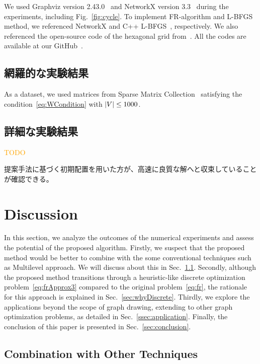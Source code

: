 \documentclass[dvipdfmx,lettersize,journal]{IEEEtran}
\newcommand{\orange}[1]{\textcolor{orange}{#1}}
\begin{document}
We used Graphviz version 2.43.0~\cite{ellsonGraphvizOpenSource2002} and NetworkX version 3.3~\cite{osti_960616} during the experiments, including Fig.~\ref{fig:cycle}.
To implement FR-algorithm and L-BFGS method, we referenced NetworkX and C++ L-BFGS~\cite{qiuYixuanLBFGSpp2024,okazakiChokkanLiblbfgs2024}, respectively.
We also referenced the open-source code of the hexagonal grid from~\cite{patelHexagonalGrids2013}.
All the codes are available at our GitHub~\cite{ThisPaperGitHub}.

\subsection{網羅的な実験結果}\label{ssec:exprAll}

As a dataset, we used matrices from Sparse Matrix Collection~\cite{davis2011university} satisfying the condition~\eqref{eq:WCondition} with $\abs{V} \leq 1000$.

\subsection{詳細な実験結果}\label{ssec:exprDetail}

\orange{TODO}

提案手法に基づく初期配置を用いた方が、高速に良質な解へと収束していることが確認できる。

\section{Discussion} \label{sec:discussion}

In this section, we analyze the outcomes of the numerical experiments and assess the potential of the proposed algorithm.
Firstly, we suspect that the proposed method would be better to combine with the some conventional techniques such as Multilevel approach.
We will discuss about this in Sec.~\ref{sec:combination}.
Secondly, although the proposed method transitions through a heuristic-like discrete optimization problem~\eqref{eq:frApprox3} compared to the original problem~\eqref{eq:fr}, the rationale for this approach is explained in Sec.~\ref{sec:whyDiscrete}.
Thirdly, we explore the applications beyond the scope of graph drawing, extending to other graph optimization problems, as detailed in Sec.~\ref{ssec:application}.
Finally, the conclusion of this paper is presented in Sec.~\ref{sec:conclusion}.

\subsection{Combination with Other Techniques}\label{sec:combination}
\end{document}
